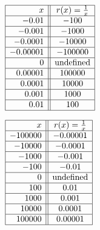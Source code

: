 \begin{table}

\begin{minipage}{0.5\linewidth}
\begin{center}

$\begin{array}{|r||c|}  \hline

  x & r(x) = \frac{1}{x}  \\ \hline
 -0.01& -100  \\  \hline
 -0.001 & -1000  \\  \hline 
 -0.0001 & -10000  \\  \hline 
 -0.00001 & -100000 \\  \hline 
0 & \text{undefined} \\  \hline
0.00001 & 100000 \\  \hline  
0.0001 & 10000  \\  \hline 
 0.001 & 1000  \\  \hline 
 0.01 & 100  \\  \hline
  \end{array} $
  
\caption{}
\label{tab:rxeqonebyxnearzero}
\end{center}
\end{minipage}
\begin{minipage}{0.5\linewidth}
\begin{center}
  
  $\begin{array}{|r||c|}  \hline

  x & r(x) = \frac{1}{x}  \\ \hline
 -100000 & -0.00001  \\  \hline 
 -10000 &  -0.0001 \\  \hline 
 -1000 & -0.001  \\  \hline 
 -100 & -0.01  \\  \hline
0 & \text{undefined} \\  \hline
 100 & 0.01  \\  \hline
 1000 & 0.001  \\  \hline 
 10000 & 0.0001 \\  \hline
 100000 & 0.00001  \\  \hline  
  \end{array} $

\caption{}
\label{tab:rxeqonebyxnearinfinity}
\end{center}
\end{minipage}

\end{table}

